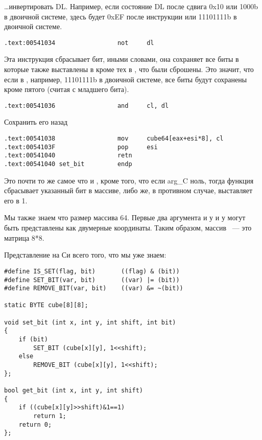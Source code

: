 \dots инвертировать DL. Например, если состояние DL после сдвига 0x10 или 1000b в двоичной системе,
здесь будет 0xEF после инструкции \NOT или 11101111b в двоичной системе.

\begin{lstlisting}[style=customasm]
.text:00541034                 not     dl
\end{lstlisting}

Эта инструкция сбрасывает бит, иными словами, она сохраняет все биты в  которые также
выставлены в  кроме тех в , что были сброшены. Это значит, что если в , например,
11101111b в двоичной системе, все биты будут сохранены кроме пятого (считая с младшего бита).

\begin{lstlisting}[style=customasm]
.text:00541036                 and     cl, dl
\end{lstlisting}

Сохранить его назад

\begin{lstlisting}[style=customasm]
.text:00541038                 mov     cube64[eax+esi*8], cl
.text:0054103F                 pop     esi
.text:00541040                 retn
.text:00541040 set_bit         endp
\end{lstlisting}

Это почти то же самое что и , кроме того, что если arg\_C ноль, тогда функция сбрасывает
указанный бит в массиве, либо же, в противном случае, выставляет его в 1.

Мы также знаем что размер массива 64. Первые два аргумента и у  и у 
могут быть представлены как двумерные координаты. Таким образом, массив ~--- это матрица 8*8.

Представление на Си всего того, что мы уже знаем:

\begin{lstlisting}[style=customc]
#define IS_SET(flag, bit)       ((flag) & (bit))
#define SET_BIT(var, bit)       ((var) |= (bit))
#define REMOVE_BIT(var, bit)    ((var) &= ~(bit))

static BYTE cube[8][8];

void set_bit (int x, int y, int shift, int bit)
{
	if (bit)
		SET_BIT (cube[x][y], 1<<shift);
	else
		REMOVE_BIT (cube[x][y], 1<<shift);
};

bool get_bit (int x, int y, int shift)
{
	if ((cube[x][y]>>shift)&1==1)
		return 1;
	return 0;
};
\end{lstlisting}

